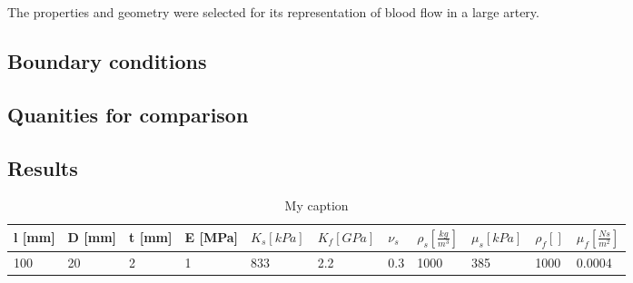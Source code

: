 The properties and geometry were selected for its representation of blood flow in a large artery. 

\subsection{Boundary conditions}


\subsection{Quanities for comparison}

\subsection{Results}
\begin{table}[h!]
\centering
\caption{My caption}
\label{my-label}
\begin{tabular}{|l|l|l|l|l|l|l|l|l|l|l|}
\hline
l {[}mm{]} & D {[}mm{]} & t {[}mm{]} & E {[}MPa{]} & $K_s [kPa] $ & $K_f [GPa]$ & $\nu_s $ & $\rho_s [\frac{kg}{m^3}]$ & $ \mu_s [kPa]  $ & $\rho_f []$ & $\mu_f [\frac{Ns}{m^2}]$ \\ \hline
100 & 20 & 2 & 1 & 833 & 2.2 & 0.3 & 1000 & 385 & 1000 & 0.0004 \\ \hline
\end{tabular}
\end{table}